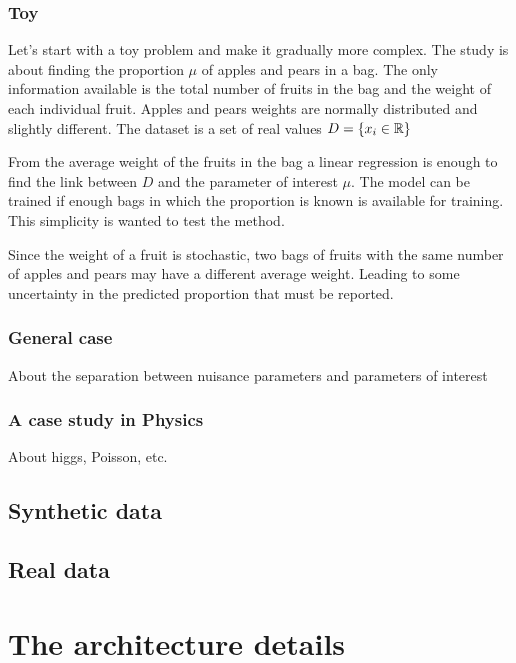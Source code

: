\subsubsection{Toy}

Let's start with a toy problem and make it gradually more complex.
The study is about finding the proportion $\mu$ of apples and pears in a bag.
The only information available is the total number of fruits in the bag and the weight of each individual fruit.
Apples and pears weights are normally distributed and slightly different.
The dataset is a set of real values $D = \{ x_i \in \mathbb{R} \} $

From the average weight of the fruits in the bag a linear regression is enough to find the link between $D$ and the parameter of interest $\mu$.
The model can be trained if enough bags in which the proportion is known is available for training.
This simplicity is wanted to test the method.

Since the weight of a fruit is stochastic, two bags of fruits with the same number of apples and pears may have a different average weight.
Leading to some uncertainty in the predicted proportion that must be reported.




\subsubsection{General case} 

About the separation between nuisance parameters and parameters of interest

\subsubsection{A case study in Physics} 

About higgs, Poisson, etc.


\subsection{Synthetic data}

\subsection{Real data}


\section{The architecture details}

